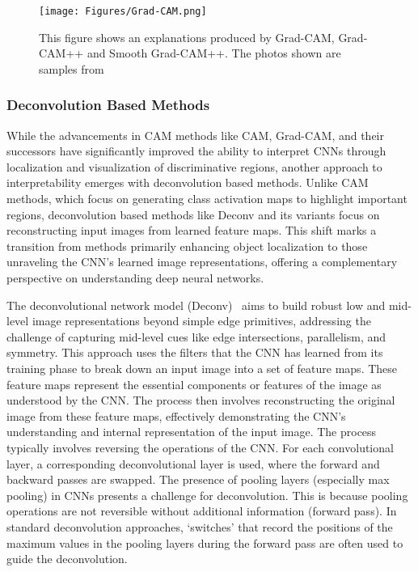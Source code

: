 \begin{figure}[ht!]
	\begin{center}
		\texttt{[image: Figures/Grad-CAM.png]}
	\end{center}
	\caption{This figure shows an explanations produced by Grad-CAM, Grad-CAM++ and Smooth Grad-CAM++. The photos shown are samples from~\cite{abs-1908-01224}}
	\label{Fig:VAE}
\end{figure} 
\subsubsection{Deconvolution Based Methods}

While the advancements in CAM methods like CAM, Grad-CAM, and their successors have significantly improved the ability to interpret CNNs through localization and visualization of discriminative regions, another approach to interpretability emerges with deconvolution based methods. Unlike CAM methods, which focus on generating class activation maps to highlight important regions, deconvolution based methods like Deconv and its variants focus on reconstructing input images from learned feature maps. This shift marks a transition from methods primarily enhancing object localization to those unraveling the CNN's learned image representations, offering a complementary perspective on understanding deep neural networks. 

The deconvolutional network model (Deconv)~\cite{ZeilerKTF10} aims to build robust low and mid-level image representations beyond simple edge primitives, addressing the challenge of capturing mid-level cues like edge intersections, parallelism, and symmetry. This approach uses the filters that the CNN has learned from its training phase to break down an input image into a set of feature maps. These feature maps represent the essential components or features of the image as understood by the CNN. The process then involves reconstructing the original image from these feature maps, effectively demonstrating the CNN's understanding and internal representation of the input image. The process typically involves reversing the operations of the CNN. For each convolutional layer, a corresponding deconvolutional layer is used, where the forward and backward passes are swapped. The presence of pooling layers (especially max pooling) in CNNs presents a challenge for deconvolution. This is because pooling operations are not reversible without additional information (\eg forward pass). In standard deconvolution approaches, `switches' that record the positions of the maximum values in the pooling layers during the forward pass are often used to guide the deconvolution.

